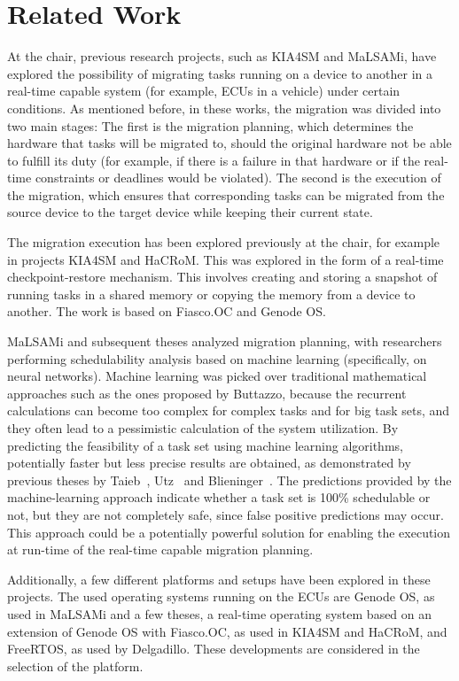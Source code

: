 \section*{Related Work}\label{section:relatedwork}
At the chair, previous research projects, such as KIA4SM and MaLSAMi, have explored the possibility of migrating tasks running on a device to another in a real-time capable system (for example, ECUs in a vehicle) under certain conditions. As mentioned before, in these works, the migration was divided into two main stages: The first is the migration planning, which determines the hardware that tasks will be migrated to, should the original hardware not be able to fulfill its duty (for example, if there is a failure in that hardware or if the real-time constraints or deadlines would be violated). The second is the execution of the migration, which ensures that corresponding tasks can be migrated from the source device to the target device while keeping their current state.

The migration execution has been explored previously at the chair, for example in projects KIA4SM and HaCRoM. This was explored in the form of a real-time checkpoint-restore mechanism. This involves creating and storing a snapshot of running tasks in a shared memory or copying the memory from a device to another. The work is based on Fiasco.OC and Genode OS. 

MaLSAMi and subsequent theses analyzed migration planning, with researchers performing schedulability analysis based on machine learning (specifically, on neural networks). Machine learning was picked over traditional mathematical approaches such as the ones proposed by Buttazzo, because the recurrent calculations can become too complex for complex tasks and for big task sets, and they often lead to a pessimistic calculation of the system utilization. By predicting the feasibility of a task set using machine learning algorithms, potentially faster but less precise results are obtained, as demonstrated by previous theses by Taieb~\parencite{taieb1}, Utz~\parencite{utz1} and Blieninger~\parencite{blieninger1}. The predictions provided by the machine-learning approach indicate whether a task set is 100\% schedulable or not, but they are not completely safe, since false positive predictions may occur. This approach could be a potentially powerful solution for enabling the execution at run-time of the real-time capable migration planning. 

Additionally, a few different platforms and setups have been explored in these projects. The used operating systems running on the ECUs are Genode OS, as used in MaLSAMi and a few theses, a real-time operating system based on an extension of Genode OS with Fiasco.OC, as used in KIA4SM and HaCRoM, and FreeRTOS, as used by Delgadillo. These developments are considered in the selection of the platform.

